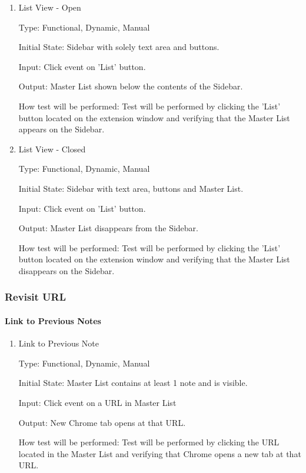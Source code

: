 \documentclass[12pt, titlepage]{article}
\begin{document}
\begin{enumerate}
	
	\item{List View - Open\\}
	
	Type: Functional, Dynamic, Manual
	
	Initial State: Sidebar with solely text area and buttons. 
	
	Input: Click event on 'List' button.
	
	Output: Master List shown below the contents of the Sidebar.
	
	How test will be performed: Test will be performed by clicking the 'List' button located 
	on the extension window and verifying that the Master List appears on the Sidebar. 
	
	\item{List View - Closed\\}
	
	Type: Functional, Dynamic, Manual
	
	Initial State: Sidebar with text area, buttons and Master List. 
	
	Input: Click event on 'List' button.
	
	Output: Master List disappears from the Sidebar.
	
	How test will be performed: Test will be performed by clicking the 'List' button located 
	on the extension window and verifying that the Master List disappears on the Sidebar.  
	
\end{enumerate}

\subsubsection{Revisit URL}

\paragraph{Link to Previous Notes}

\begin{enumerate}
	
	\item{Link to Previous Note\\}
	
	Type: Functional, Dynamic, Manual
	
	Initial State: Master List contains at least 1 note and is visible. 
	
	Input: Click event on a URL in Master List
	
	Output: New Chrome tab opens at that URL.
	
	How test will be performed: Test will be performed by clicking the URL 
	located in the Master List and verifying that Chrome opens a new tab at 
	that URL.
	
\end{enumerate}
\end{document}
